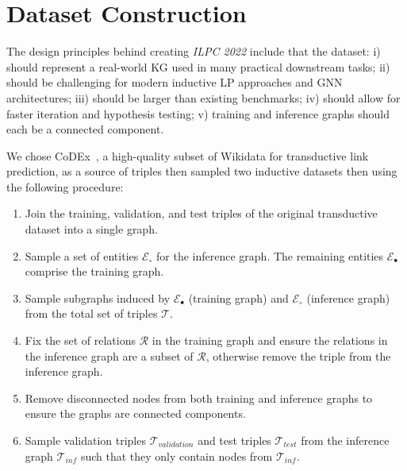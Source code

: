 \documentclass[sigconf,screen]{acmart}
\newcommand{\ilpc}{\textsl{\textsc{ILPC 2022}}\xspace}
\begin{document}
\section{Dataset Construction}
\label{sec:ds_construction}

The design principles behind creating \ilpc include that the dataset: i) should represent a real-world KG used in many practical downstream tasks; ii) should be challenging for modern inductive LP approaches and GNN architectures; iii) should be larger than existing benchmarks; iv) should allow for faster iteration and hypothesis testing; v) training and inference graphs should each be a connected component.

We chose CoDEx~\cite{safavi2020}, a high-quality subset of Wikidata for transductive link prediction, as a source of triples then sampled two inductive datasets then using the following procedure:
\begin{enumerate}
    \item Join the training, validation, and test triples of the original transductive dataset into a single graph.
    \item Sample a set of entities $\mathcal{E}_{\circ}$ for the inference graph. The remaining entities $\mathcal{E}_{\bullet}$ comprise the training graph.
    \item Sample subgraphs induced by $\mathcal{E}_{\bullet}$ (training graph) and $\mathcal{E}_{\circ}$ (inference graph) from the total set of triples $\mathcal{T}$.
    \item Fix the set of relations $\mathcal{R}$ in the training graph and ensure the relations in the inference graph are a subset of $\mathcal{R}$, otherwise remove the triple from the inference graph.
    \item Remove disconnected nodes from both training and inference graphs to ensure the graphs are connected components.
    \item Sample validation triples $\mathcal{T}_{validation}$ and test triples $\mathcal{T}_{test}$ from the inference graph $\mathcal{T}_{inf}$ such that they only contain nodes from $\mathcal{T}_{inf}$. \end{enumerate}
\end{document}
